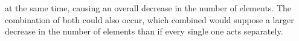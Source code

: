 at the same time, causing an overall decrease in the number of elements. The combination of both could also occur, which combined would suppose a larger decrease in the number of elements than if every single one acts separately.

%
%
